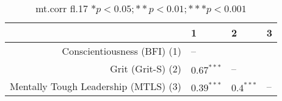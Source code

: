 \begin{table}[ht]
\centering
\begin{tabular}{rlll}
  \hline
 & 1 & 2 & 3 \\ 
  \hline
Conscientiousness (BFI) (1) & -- &  &  \\ 
  Grit (Grit-S) (2) & $0.67^{***}$ & -- &  \\ 
  Mentally Tough Leadership (MTLS) (3) & $0.39^{***}$ & $0.4^{***}$ & -- \\ 
   \hline
\end{tabular}
\caption{mt.corr fl.17 $* p < 0.05; ** p < 0.01; *** p < 0.001$} 
\label{freq_corr.mt.corr.fl.17}
\end{table}
